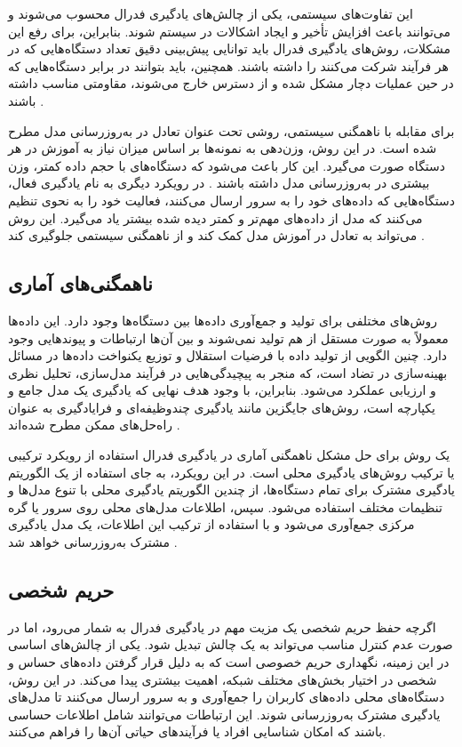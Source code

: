 این تفاوت‌های سیستمی، یکی از چالش‌های یادگیری فدرال محسوب می‌شوند و می‌توانند باعث افزایش تأخیر و ایجاد اشکالات در سیستم شوند. بنابراین، برای رفع این مشکلات، روش‌های یادگیری فدرال باید توانایی پیش‌بینی دقیق تعداد دستگاه‌هایی که در هر فرآیند شرکت می‌کنند را داشته باشند. همچنین، باید بتوانند در برابر دستگاه‌هایی که در حین عملیات دچار مشکل شده و از دسترس خارج می‌شوند، مقاومتی مناسب داشته باشند
\cite{li2020federated}.


برای مقابله با ناهمگنی سیستمی، روشی تحت عنوان تعادل در به‌روزرسانی مدل مطرح شده است. در این روش، وزن‌دهی به نمونه‌ها بر اساس میزان نیاز به آموزش در هر دستگاه صورت می‌گیرد. این کار باعث می‌شود که دستگاه‌های با حجم داده کمتر، وزن بیشتری در به‌روزرسانی مدل داشته باشند
\cite{konevcny2015federated}.
در رویکرد دیگری به نام یادگیری فعال، دستگاه‌هایی که داده‌های خود را به سرور ارسال می‌کنند، فعالیت خود را به نحوی تنظیم می‌کنند که مدل از داده‌های مهم‌تر و کمتر دیده شده بیشتر یاد می‌گیرد. این روش می‌تواند به تعادل در آموزش مدل کمک کند و از ناهمگنی سیستمی جلوگیری کند
\cite{konevcny2016federated}.


\subsection{
	ناهمگنی‌های آماری
}
روش‌های مختلفی برای تولید و جمع‌آوری داده‌ها بین دستگاه‌ها وجود دارد. این داده‌ها معمولاً به صورت مستقل از هم تولید نمی‌شوند و بین آن‌ها ارتباطات و پیوندهایی وجود دارد. چنین الگویی از تولید داده با فرضیات استقلال و توزیع یکنواخت داده‌ها%
در مسائل بهینه‌سازی در تضاد است، که منجر به پیچیدگی‌هایی در فرآیند مدل‌سازی، تحلیل نظری و ارزیابی عملکرد می‌شود. بنابراین، با وجود هدف نهایی که یادگیری یک مدل جامع و یکپارچه است، روش‌های جایگزین مانند یادگیری چندوظیفه‌ای%
و فرایادگیری%
به عنوان راه‌حل‌های ممکن مطرح شده‌اند
\cite{li2020federated}.


یک روش برای حل مشکل ناهمگنی آماری در یادگیری فدرال استفاده از رویکرد ترکیبی یا ترکیب روش‌های یادگیری محلی است. در این رویکرد، به جای استفاده از یک الگوریتم یادگیری مشترک برای تمام دستگاه‌ها، از چندین الگوریتم یادگیری محلی با تنوع مدل‌ها و تنظیمات مختلف استفاده می‌شود. سپس، اطلاعات مدل‌های محلی روی سرور یا گره مرکزی جمع‌آوری می‌شود و با استفاده از ترکیب این اطلاعات، یک مدل یادگیری مشترک به‌روزرسانی خواهد شد
\cite{konevcny2015federated}.



\subsection{حریم شخصی}
اگرچه حفظ حریم شخصی یک مزیت مهم در یادگیری فدرال به شمار می‌رود، اما در صورت عدم کنترل مناسب می‌تواند به یک چالش تبدیل شود. یکی از چالش‌های اساسی در این زمینه، نگهداری حریم خصوصی است که به دلیل قرار گرفتن داده‌های حساس و شخصی در اختیار بخش‌های مختلف شبکه، اهمیت بیشتری پیدا می‌کند. در این روش، دستگاه‌های محلی داده‌های کاربران را جمع‌آوری و به سرور ارسال می‌کنند تا مدل‌های یادگیری مشترک به‌روزرسانی شوند. این ارتباطات می‌توانند شامل اطلاعات حساسی باشند که امکان شناسایی افراد یا فرآیندهای حیاتی آن‌ها را فراهم می‌کنند.

